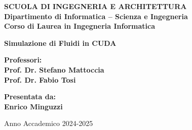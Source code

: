 \begin{titlepage}
\begin{center}
{\small{\bf SCUOLA DI INGEGNERIA E ARCHITETTURA\\
\vspace{2mm}
Dipartimento di Informatica -- Scienza e Ingegneria\\
\vspace{2mm}
Corso di Laurea in Ingegneria Informatica }}
\end{center}
\vspace{11.9mm}
\begin{center}
{\LARGE{\bf Simulazione di Fluidi in CUDA\\
\vspace{5mm}
}}
\end{center}
\vspace{11.9mm}
\par
\noindent
\begin{minipage}[t]{0.47\textwidth}
{\normalsize{\bf Professori:\\
Prof. Dr. Stefano Mattoccia \\
Prof. Dr. Fabio Tosi

}}
\end{minipage}
\hfill
\begin{minipage}[t]{0.47\textwidth}\raggedleft
{\normalsize{\bf Presentata da:\\
Enrico Minguzzi}}
\end{minipage}
\vspace{10mm} %
\begin{center}
{\normalsize{%
Anno Accademico 2024-2025}}%
\end{center}
\end{titlepage}
